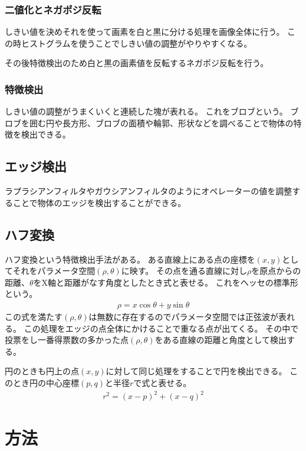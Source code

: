 \documentclass{jlreq}
\begin{document}
\subsubsection{二値化とネガポジ反転}
しきい値を決めそれを使って画素を白と黒に分ける処理を画像全体に行う。
この時ヒストグラムを使うことでしきい値の調整がやりやすくなる。

その後特徴検出のため白と黒の画素値を反転するネガポジ反転を行う。

\subsubsection{特徴検出}
しきい値の調整がうまくいくと連続した塊が表れる。
これをブロブという。
ブロブを囲む円や長方形、ブロブの面積や輪郭、形状などを調べることで物体の特徴を検出できる。

\subsection{エッジ検出}
ラプラシアンフィルタやガウシアンフィルタのようにオペレーターの値を調整することで物体のエッジを検出することができる。

\subsection{ハフ変換}
ハフ変換という特徴検出手法がある。 %
ある直線上にある点の座標を\((x,y)\)としてそれをパラメータ空間\((\rho,\theta)\)に映す。
その点を通る直線に対し\(\rho\)を原点からの距離、\(\theta\)をX軸と距離がなす角度としたとき式と表せる。
これをヘッセの標準形という。
\begin{align}
	\rho = x\cos\theta + y\sin\theta \label{eq:HesseNormalForm}
\end{align}
この式を満たす\((\rho,\theta)\)は無数に存在するのでパラメータ空間では正弦波が表れる。
この処理をエッジの点全体にかけることで重なる点が出てくる。
その中で投票をし一番得票数の多かった点\((\rho,\theta)\)をある直線の距離と角度として検出する。

円のときも円上の点\((x,y)\)に対して同じ処理をすることで円を検出できる。 %
このとき円の中心座標\((p,q)\)と半径\(r\)で式と表せる。
\begin{align}
	r ^ 2 = (x - p) ^ 2 + (x - q) ^ 2 \label{eq:HoughCircle}
\end{align}

\section{方法}
\end{document}
